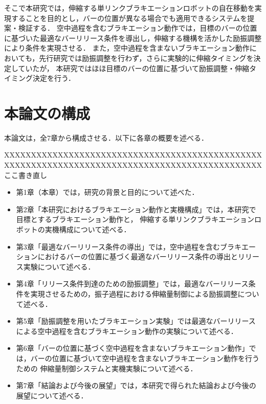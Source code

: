           そこで本研究では，伸縮する単リンクブラキエーションロボットの自在移動を実現することを目的とし，バーの位置が異なる場合でも適用できるシステムを提案・検証する．
          空中過程を含むブラキエーション動作では，目標のバーの位置に基づいた最適なバーリリース条件を導出し，伸縮する機構を活かした励振調整により条件を実現させる．
          また，空中過程を含まないブラキエーション動作においても，先行研究では励振調整を行わず，さらに実験的に伸縮タイミングを決定していたが\cite{Hijiri:Robomech2024}，
          本研究ではほほ目標のバーの位置に基づいて励振調整・伸縮タイミング決定を行う．
          
        \section{本論文の構成}

          本論文は，全7章から構成させる．以下に各章の概要を述べる．

          XXXXXXXXXXXXXXXXXXXXXXXXXXXXXXXXXXXXXXXXXXXXXXXXXXXXXXXXXXXXXXXXXXXXXXXXXXXXXXXXXXXXXXXXXXXXXXXX
          ここ書き直し
          \begin{itemize}
            \item 第1章（本章）では，研究の背景と目的について述べた．
            \item 第2章「本研究におけるブラキエーション動作と実機構成」では，本研究で目標とするブラキエーション動作と，
            伸縮する単リンクブラキエーションロボットの実機構成について述べる．
            \item 第3章「最適なバーリリース条件の導出」では，空中過程を含むブラキエーションにおけるバーの位置に基づく最適なバーリリース条件の導出とリリース実験について述べる．
            \item 第4章「リリース条件到達のための励振調整」では，最適なバーリリース条件を実現させるための，振子過程における伸縮量制御による励振調整について述べる．
            \item 第5章「励振調整を用いたブラキエーション実験」では最適なバーリリースによる空中過程を含むブラキエーション動作の実験について述べる．
            \item 第6章「バーの位置に基づく空中過程を含まないブラキエーション動作」では，バーの位置に基づいて空中過程を含まないブラキエーション動作を行うための
            伸縮量制御システムと実機実験について述べる．
            \item 第7章「結論および今後の展望」では，本研究で得られた結論および今後の展望について述べる．
          \end{itemize}

